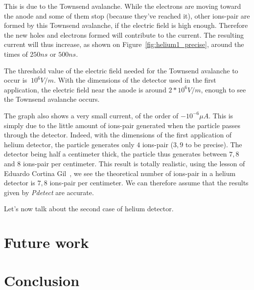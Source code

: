 \documentclass[11pt]{article}
\begin{document}
			This is due to the Townsend avalanche. While the electrons are moving toward the anode and some of them stop
			(because they've reached it), other ions-pair are formed by this Townsend avalanche, if the electric field is 
			high enough. Therefore the new holes and electrons formed will contribute to the current. The resulting current
			will thus increase, as shown on Figure~\ref{fig:helium1_precise}, around the times of $250ns$ or $500ns$.

			The threshold value of the electric field needed for the Townsend avalanche to occur is $~10^6V/m$. With the 
			dimensions of the detector used in the first application, the electric field near the anode is around 
			$2*10^6V/m$, enough to see the Townsend avalanche occurs.

			The graph also shows a very small current, of the order of $-10^{-6}\mu A$. This is simply due to the little
			amount of ions-pair generated when the particle passes through the detector. Indeed, with the dimensions of the
			first application of helium detector, the particle generates only $4$ ions-pair ($3,9$ to be precise). The detector 
			being half a centimeter thick, the particle thus generates between $7,8$ and $8$ ions-pair per centimeter.
			This result is totally realistic, using the lesson of Eduardo Cortina Gil~\cite{lphy2236}, we see the theoretical
			number of ions-pair in a helium detector is $7,8$ ions-pair per centimeter. We can therefore assume that the
			results given by \textit{Pdetect} are accurate.

			Let's now talk about the second case of helium detector.

\section{Future work}

\section{Conclusion}

\newpage



\end{document}
